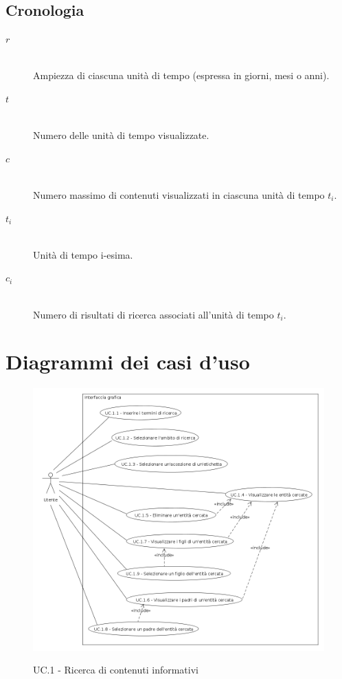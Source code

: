 \subsection*{Cronologia}
\begin{description}
	\item[$r$] \hfill \\
	Ampiezza di ciascuna unità di tempo (espressa in giorni, mesi o anni).
	\item[$t$] \hfill \\
	Numero delle unità di tempo visualizzate.
	\item[$c$] \hfill \\
	Numero massimo di contenuti visualizzati in ciascuna unità di tempo $t_i$.
	\item[$t_i$] \hfill \\
	Unità di tempo i-esima.
	\item[$c_i$] \hfill \\
	Numero di risultati di ricerca associati all'unità di tempo $t_i$.
\end{description}

\section*{Diagrammi dei casi d'uso}

\begin{figure}[ht]
	\begin{center}
    	\includegraphics[width=12cm]{img/uc_1.png}
		\label{gfx:uc:1}
		\caption{UC.1 - Ricerca di contenuti informativi}
	\end{center}
\end{figure}

